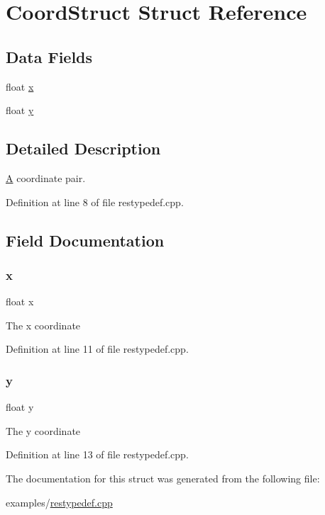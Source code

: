 \hypertarget{struct_coord_struct}{}\section{Coord\+Struct Struct Reference}
\label{struct_coord_struct}
\subsection*{Data Fields}
\begin{DoxyCompactItemize}
\item 
float \hyperlink{struct_coord_struct_ad0da36b2558901e21e7a30f6c227a45e}{x}
\item 
float \hyperlink{struct_coord_struct_aa4f0d3eebc3c443f9be81bf48561a217}{y}
\end{DoxyCompactItemize}


\subsection{Detailed Description}
\hyperlink{class_a}{A} coordinate pair. 

Definition at line 8 of file restypedef.\+cpp.



\subsection{Field Documentation}
\mbox{\label{struct_coord_struct_ad0da36b2558901e21e7a30f6c227a45e}} 
\subsubsection{\texorpdfstring{x}{x}}
{\footnotesize\ttfamily float x}

The x coordinate 

Definition at line 11 of file restypedef.\+cpp.

\mbox{\label{struct_coord_struct_aa4f0d3eebc3c443f9be81bf48561a217}} 
\subsubsection{\texorpdfstring{y}{y}}
{\footnotesize\ttfamily float y}

The y coordinate 

Definition at line 13 of file restypedef.\+cpp.



The documentation for this struct was generated from the following file\+:\begin{DoxyCompactItemize}
\item 
examples/\hyperlink{restypedef_8cpp}{restypedef.\+cpp}\end{DoxyCompactItemize}
